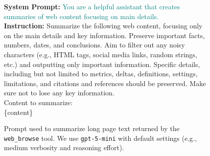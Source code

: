 \documentclass{article}
\begin{document}
\begin{figure}[h]
\begin{small}
\centering
\begin{tcolorbox}[
    colback=gray!5,
    colframe=black,
    width=\linewidth,
    arc=2mm,
    boxrule=0.5pt,
    title=\textbf{Summarization Prompt}
]
\textbf{System Prompt:} \textcolor{teal}{You are a helpful assistant that creates summaries of web content focusing on main details.}\\

\textbf{Instruction:} Summarize the following web content, focusing only on the main details and key information. Preserve important facts, numbers, dates, and conclusions. Aim to filter out any noisy characters (e.g., HTML tags, social media links, random strings, etc.) and outputting only important information. Specific details, including but not limited to metrics, deltas, definitions, settings, limitations, and citations and references should be preserved. Make sure not to lose any key information. \\

Content to summarize:\\
\{content\}
\end{tcolorbox}

\caption{Prompt used to summarize long page text returned by the \texttt{web\_browse} tool. We use \texttt{gpt-5-mini} with default settings (e.g., medium verbosity and reasoning effort).}
\label{fig:summarization-prompt}
\end{small}
\end{figure}




\clearpage
\end{document}

